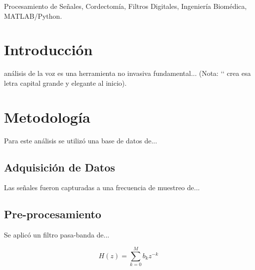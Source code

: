 \documentclass[journal, compsoc, 12pt]{IEEEtran}
\begin{document}
\maketitle

\begin{abstract}
\textbf{Resumen}---Aquí presentas la síntesis de tu victoria. El objetivo de este proyecto es analizar señales de voz para identificar patrones asociados a la cordectomía. Se implementaron filtros digitales (FIR/IIR) y se analizaron las frecuencias fundamentales... 
\end{abstract}

\begin{IEEEkeywords}
Procesamiento de Señales, Cordectomía, Filtros Digitales, Ingeniería Biomédica, MATLAB/Python.
\end{IEEEkeywords}


\section{Introducción}
 análisis de la voz es una herramienta no invasiva fundamental... (Nota: `\IEEEPARstart` crea esa letra capital grande y elegante al inicio).


\section{Metodología}
Para este análisis se utilizó una base de datos de...

\subsection{Adquisición de Datos}
Las señales fueron capturadas a una frecuencia de muestreo de...

\subsection{Pre-procesamiento}
Se aplicó un filtro pasa-banda de...

\begin{equation}
    H(z) = \sum_{k=0}^{M} b_k z^{-k}
    \label{eq:filtro}
\end{equation}
\end{document}
